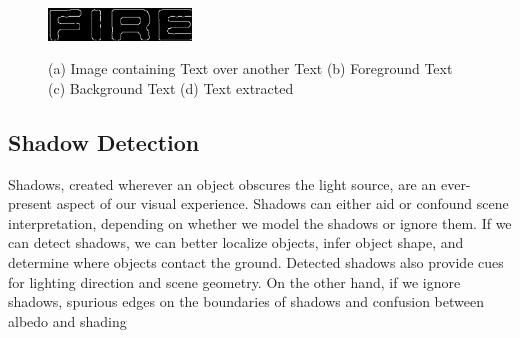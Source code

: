 {{\begin{figure}[htbp]
{\includegraphics[height=.7in,width=1.5in]{chap4/edge_detect/3.eps}
}
\caption
{(a) Image containing Text over another Text (b) Foreground Text (c) Background Text (d)
Text extracted}
\label{fig:20}
\end{figure}
\subsection{Shadow Detection}
Shadows, created wherever an object obscures the light
source, are an ever-present aspect of our visual experience.
Shadows can either aid or confound scene interpretation,
depending on whether we model the shadows or ignore
them. If we can detect shadows, we can better localize objects, 
infer object shape, and determine where objects contact the ground. Detected shadows also provide cues for
lighting direction and scene geometry. On the other
hand, if we ignore shadows, spurious edges on the boundaries of shadows and confusion between albedo and shading

}}
